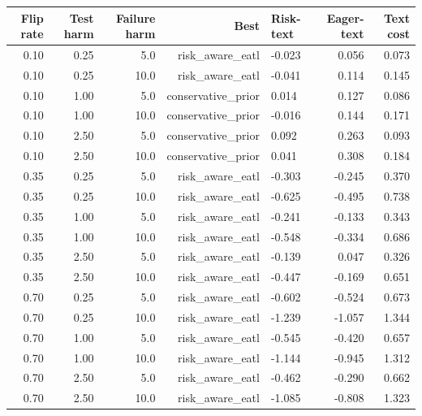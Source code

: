 \begin{tabular}{rrrrlrr}
\toprule
Flip rate & Test harm & Failure harm & Best & Risk-text & Eager-text & Text cost \\
\midrule
0.10 & 0.25 & 5.0 & risk\_aware\_eatl & -0.023 & 0.056 & 0.073 \\
0.10 & 0.25 & 10.0 & risk\_aware\_eatl & -0.041 & 0.114 & 0.145 \\
0.10 & 1.00 & 5.0 & conservative\_prior & 0.014 & 0.127 & 0.086 \\
0.10 & 1.00 & 10.0 & conservative\_prior & -0.016 & 0.144 & 0.171 \\
0.10 & 2.50 & 5.0 & conservative\_prior & 0.092 & 0.263 & 0.093 \\
0.10 & 2.50 & 10.0 & conservative\_prior & 0.041 & 0.308 & 0.184 \\
0.35 & 0.25 & 5.0 & risk\_aware\_eatl & -0.303 & -0.245 & 0.370 \\
0.35 & 0.25 & 10.0 & risk\_aware\_eatl & -0.625 & -0.495 & 0.738 \\
0.35 & 1.00 & 5.0 & risk\_aware\_eatl & -0.241 & -0.133 & 0.343 \\
0.35 & 1.00 & 10.0 & risk\_aware\_eatl & -0.548 & -0.334 & 0.686 \\
0.35 & 2.50 & 5.0 & risk\_aware\_eatl & -0.139 & 0.047 & 0.326 \\
0.35 & 2.50 & 10.0 & risk\_aware\_eatl & -0.447 & -0.169 & 0.651 \\
0.70 & 0.25 & 5.0 & risk\_aware\_eatl & -0.602 & -0.524 & 0.673 \\
0.70 & 0.25 & 10.0 & risk\_aware\_eatl & -1.239 & -1.057 & 1.344 \\
0.70 & 1.00 & 5.0 & risk\_aware\_eatl & -0.545 & -0.420 & 0.657 \\
0.70 & 1.00 & 10.0 & risk\_aware\_eatl & -1.144 & -0.945 & 1.312 \\
0.70 & 2.50 & 5.0 & risk\_aware\_eatl & -0.462 & -0.290 & 0.662 \\
0.70 & 2.50 & 10.0 & risk\_aware\_eatl & -1.085 & -0.808 & 1.323 \\
\bottomrule
\end{tabular}
